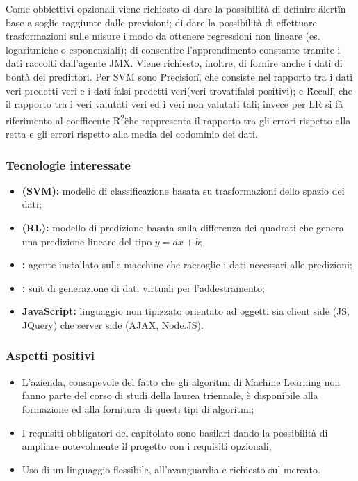 			Come obbiettivi opzionali viene richiesto di dare la possibilità di definire \"alert\" in base a soglie raggiunte dalle previsioni; di dare la possibilità di effettuare trasformazioni sulle misure i modo da ottenere regressioni non lineare (es. logaritmiche o esponenziali); di consentire l'apprendimento constante tramite i dati raccolti dall'agente JMX. Viene richiesto, inoltre,  di fornire anche i dati di bontà dei predittori. Per SVM sono \"Precision\", che consiste nel rapporto tra i dati veri predetti veri e i dati falsi predetti veri(veri trovati\/falsi positivi); e \"Recall\", che il rapporto tra i veri valutati veri ed i veri non valutati tali; invece per LR si fà riferimento al coefficente \"R\textsuperscript{2}\" che rappresenta il rapporto tra gli errori rispetto alla retta e gli errori rispetto alla media del codominio dei dati.


		\subsubsection{Tecnologie interessate}
			\begin{itemize}
			  \item \textbf{ (SVM):} modello di classificazione basata su trasformazioni dello spazio dei dati;
			  \item \textbf{ (RL):} modello di predizione basata sulla differenza dei quadrati che genera una predizione lineare del tipo \(y=ax+b\);
				\item \textbf{:} agente installato sulle macchine che raccoglie i dati necessari alle predizioni;
				\item \textbf{:} suit di generazione di dati virtuali per l'addestramento;
			  \item \textbf{JavaScript:} linguaggio non tipizzato orientato ad oggetti sia client side (JS, JQuery) che server side (AJAX, Node.JS).
			\end{itemize}

		\subsubsection{Aspetti positivi}
			\begin{itemize}
			  \item L’azienda, consapevole del fatto che gli algoritmi di Machine Learning non fanno parte del corso di studi della laurea triennale, è disponibile alla formazione ed alla fornitura di questi tipi di algoritmi;
			  \item I requisiti obbligatori del capitolato sono basilari dando la possibilità di ampliare notevolmente il progetto con i requisiti opzionali;
			  \item Uso di un linguaggio flessibile, all'avanguardia e richiesto sul mercato.
			\end{itemize}

